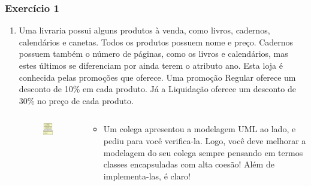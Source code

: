 \documentclass[aspectratio=169]{beamer}
\newcommand\setItemnumber[1]{\setcounter{enumi}{\numexpr#1-1\relax}}
\begin{document}
\begin{frame}\frametitle{Exercício 1}
\begin{enumerate}
	\setItemnumber{1}
	\item Uma livraria possui alguns produtos à venda, como livros, cadernos, calendários e canetas. Todos os produtos possuem nome e preço. Cadernos possuem também o número de páginas, como os livros e calendários, mas estes últimos se diferenciam por ainda terem o atributo ano. Esta loja é conhecida pelas promoções que oferece. Uma promoção Regular oferece um desconto de 10\% em cada produto. Já a Liquidação oferece um desconto de 30\% no preço de cada produto.
\begin{columns}
\begin{column}{0.4\linewidth}
\begin{figure}[h]
	\centering
	\includegraphics[height=0.35\paperheight]{imagens/modelagem_livraria.png}
\end{figure}
\end{column}
\begin{column}{0.6\linewidth}
\begin{itemize}
	\item Um colega apresentou a modelagem UML ao lado, e pediu para você verifica-la. Logo, você deve melhorar a modelagem do seu colega sempre pensando em termos classes encapsuladas com alta coesão! Além de implementa-las, é claro!
\end{itemize}
\end{column}
\end{columns}
\end{enumerate}
\end{frame}
\end{document}
